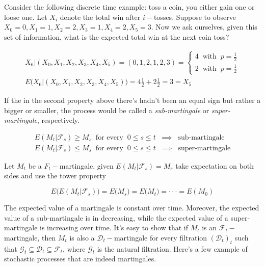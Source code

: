 Consider the following discrete time example: toss a coin, you either gain one or loose one. Let $X_i$ denote the total win after $i-$tosses. Suppose to observe $X_0 =0, X_1 = 1, X_2 = 2, X_3 = 1, X_4 = 2, X_5 = 3$. Now we ask ourselves, given this set of information, what is the expected total win at the next coin toss?

\begin{gather*}
    X_6 \vert (X_0,X_1,X_2,X_3,X_4,X_5) = (0,1,2,1,2,3) = \begin{cases}
        4 \;\; \text{with} \;\; p = \frac{1}{2} \\
        2 \;\; \text{with} \;\; p = \frac{1}{2} 
    \end{cases} \\
    E\big(X_6 \vert (X_0,X_1,X_2,X_3,X_4,X_5)\big) = 4 \frac{1}{2} + 2 \frac{1}{2} = 3 = X_5
\end{gather*}

If the in the second property above there's hadn't been an equal sign but rather a bigger or smaller, the process would be called a \textit{sub-martingale} or \textit{super-martingale}, respectively. 

\begin{gather*}
    E(M_t \vert \mathcal{F}_s) \geq M_s \;\; \text{for every} \;\; 0 \leq s \leq t \;\; \implies \;\; \text{sub-martingale} \\
    E(M_t \vert \mathcal{F}_s) \leq M_s \;\; \text{for every} \;\; 0 \leq s \leq t \;\; \implies \;\; \text{super-martingale}
\end{gather*}

Let $M_t$ be a $F_t-$martingale, given $E(M_t \vert \mathcal{F}_s) = M_s$ take expectation on both sides and use the tower property

\begin{equation*}
    E\Big( E(M_t \vert \mathcal{F}_s) \Big) = E\big( M_s \big) = E\big( M_t \big) = \cdot\cdot\cdot = E(M_0)
\end{equation*}

The expected value of a martingale is constant over time. Moreover, the expected value of a sub-martingale is in decreasing, while the expected value of a super-martingale is increasing over time. It's easy to show that if $M_t$ is an $\mathcal{F}_t-$martingale, then $M_t$ is also a $\mathcal{D}_t-$martingale for every filtration $(\mathcal{D}_t)_t$ such that $\mathcal{G}_t \subseteq \mathcal{D}_t \subseteq \mathcal{F}_t$, where $\mathcal{G}_t$ is the natural filtration. Here's a few example of stochastic processes that are indeed martingales.

